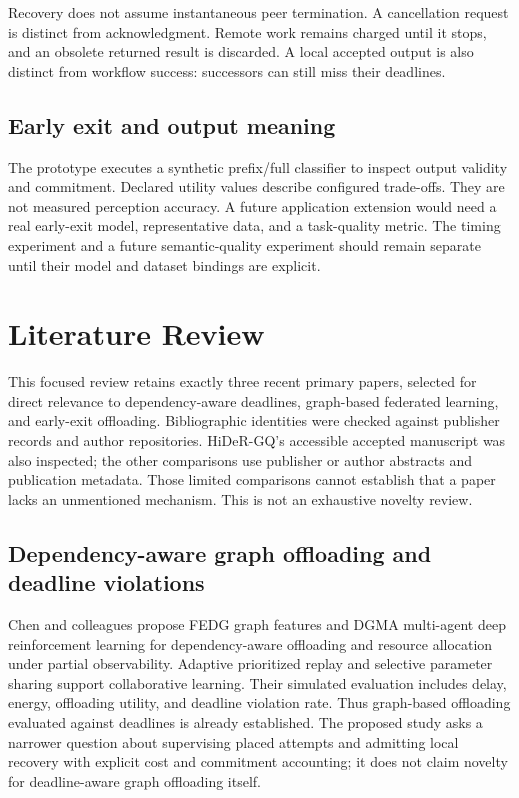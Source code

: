 \documentclass[11pt,a4paper]{article}
\begin{document}
Recovery does not assume instantaneous peer termination. A cancellation request
is distinct from acknowledgment. Remote work remains charged until it stops,
and an obsolete returned result is discarded. A local accepted output is also
distinct from workflow success: successors can still miss their deadlines.

\subsection{Early exit and output meaning}
The prototype executes a synthetic prefix/full classifier to inspect output
validity and commitment. Declared utility values describe configured trade-offs.
They are not measured perception accuracy. A future application extension would
need a real early-exit model, representative data, and a task-quality metric.
The timing experiment and a future semantic-quality experiment should remain
separate until their model and dataset bindings are explicit.

\section{Literature Review}
This focused review retains exactly three recent primary papers, selected for
direct relevance to dependency-aware deadlines, graph-based federated learning,
and early-exit offloading. Bibliographic identities were checked against publisher
records and author repositories. HiDeR-GQ's accessible accepted manuscript was
also inspected; the other comparisons use publisher or author abstracts and
publication metadata. Those limited comparisons cannot establish that a paper
lacks an unmentioned mechanism. This is not an exhaustive novelty review.

\subsection{Dependency-aware graph offloading and deadline violations}
Chen and colleagues propose FEDG graph features and DGMA multi-agent deep
reinforcement learning for dependency-aware offloading and resource
allocation under partial observability\cite{chen2026}. Adaptive prioritized
replay and selective parameter sharing support collaborative learning.
Their simulated evaluation includes delay, energy, offloading utility, and
deadline violation rate. Thus graph-based offloading evaluated against
deadlines is already established. The proposed study asks a narrower question
about supervising placed attempts and admitting local recovery with explicit
cost and commitment accounting; it does not claim novelty for deadline-aware
graph offloading itself.
\end{document}
